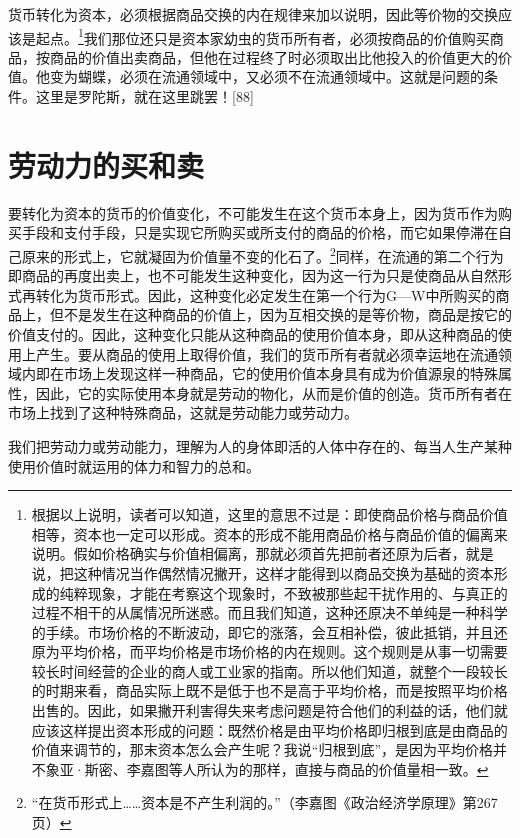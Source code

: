 \documentclass{ctexbook}
\begin{document}
    货币转化为资本，必须根据商品交换的内在规律来加以说明，因此等价物的交换应该是起点。\footnote{根据以上说明，读者可以知道，这里的意思不过是：即使商品价格与商品价值相等，资本也一定可以形成。资本的形成不能用商品价格与商品价值的偏离来说明。假如价格确实与价值相偏离，那就必须首先把前者还原为后者，就是说，把这种情况当作偶然情况撇开，这样才能得到以商品交换为基础的资本形成的纯粹现象，才能在考察这个现象时，不致被那些起干扰作用的、与真正的过程不相干的从属情况所迷惑。而且我们知道，这种还原决不单纯是一种科学的手续。市场价格的不断波动，即它的涨落，会互相补偿，彼此抵销，并且还原为平均价格，而平均价格是市场价格的内在规则。这个规则是从事一切需要较长时间经营的企业的商人或工业家的指南。所以他们知道，就整个一段较长的时期来看，商品实际上既不是低于也不是高于平均价格，而是按照平均价格出售的。因此，如果撇开利害得失来考虑问题是符合他们的利益的话，他们就应该这样提出资本形成的问题：既然价格是由平均价格即归根到底是由商品的价值来调节的，那末资本怎么会产生呢？我说“归根到底”，是因为平均价格并不象亚·斯密、李嘉图等人所认为的那样，直接与商品的价值量相一致。}我们那位还只是资本家幼虫的货币所有者，必须按商品的价值购买商品，按商品的价值出卖商品，但他在过程终了时必须取出比他投入的价值更大的价值。他变为蝴蝶，必须在流通领域中，又必须不在流通领域中。这就是问题的条件。这里是罗陀斯，就在这里跳罢！[88]

    \section{劳动力的买和卖}

    要转化为资本的货币的价值变化，不可能发生在这个货币本身上，因为货币作为购买手段和支付手段，只是实现它所购买或所支付的商品的价格，而它如果停滞在自己原来的形式上，它就凝固为价值量不变的化石了。\footnote{“在货币形式上……资本是不产生利润的。”（李嘉图《政治经济学原理》第267页）}同样，在流通的第二个行为即商品的再度出卖上，也不可能发生这种变化，因为这一行为只是使商品从自然形式再转化为货币形式。因此，这种变化必定发生在第一个行为G—W中所购买的商品上，但不是发生在这种商品的价值上，因为互相交换的是等价物，商品是按它的价值支付的。因此，这种变化只能从这种商品的使用价值本身，即从这种商品的使用上产生。要从商品的使用上取得价值，我们的货币所有者就必须幸运地在流通领域内即在市场上发现这样一种商品，它的使用价值本身具有成为价值源泉的特殊属性，因此，它的实际使用本身就是劳动的物化，从而是价值的创造。货币所有者在市场上找到了这种特殊商品，这就是劳动能力或劳动力。

    我们把劳动力或劳动能力，理解为人的身体即活的人体中存在的、每当人生产某种使用价值时就运用的体力和智力的总和。
\end{document}
